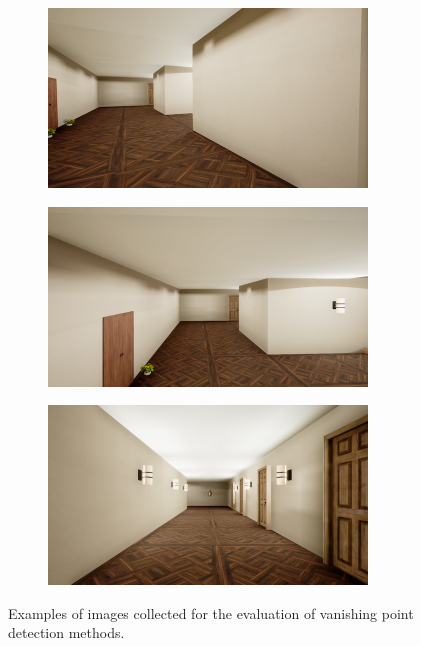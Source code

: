 \begin{figure}[H]
\begin{subfigure}{0.32\textwidth}
        \vspace{0.5em}
    \end{subfigure}
    \begin{subfigure}{0.32\textwidth}
        \centering
        \includegraphics[width=\textwidth]{resources/png/06/vanishing-point/evaluation/3.png}
    \end{subfigure}
    \hfill
    \begin{subfigure}{0.32\textwidth}
        \centering
        \includegraphics[width=\textwidth]{resources/png/06/vanishing-point/evaluation/4.png}
    \end{subfigure}
    \hfill
    \begin{subfigure}{0.32\textwidth}
        \centering
        \includegraphics[width=\textwidth]{resources/png/06/vanishing-point/evaluation/5.png}
    \end{subfigure}
    \caption{Examples of images collected for the evaluation of vanishing point detection methods.}
    \label{fig:06.vanishing.point.evaluation.examples}
\end{figure}

